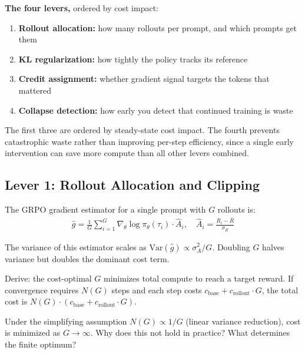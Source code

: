 \medskip
\textbf{The four levers,} ordered by cost impact:
\begin{enumerate}
  \item \textbf{Rollout allocation:} how many rollouts per prompt, and which prompts get them
  \item \textbf{KL regularization:} how tightly the policy tracks its reference
  \item \textbf{Credit assignment:} whether gradient signal targets the tokens that mattered
  \item \textbf{Collapse detection:} how early you detect that continued training is waste
\end{enumerate}

The first three are ordered by steady-state cost impact. The fourth prevents catastrophic waste rather than improving per-step efficiency, since a single early intervention can save more compute than all other levers combined.

\subsection*{Lever 1: Rollout Allocation and Clipping}

\begin{thinkfirst}
The GRPO gradient estimator for a single prompt with $G$ rollouts is:
\begin{align*}
  \hat{g} = \frac{1}{G} \sum_{i=1}^{G} \nabla_\theta \log \pi_\theta(\tau_i) \cdot \hat{A}_i, \quad \hat{A}_i = \frac{R_i - \bar{R}}{\sigma_R}
\end{align*}

The variance of this estimator scales as $\mathrm{Var}(\hat{g}) \propto \sigma^2_A / G$. Doubling $G$ halves variance but doubles the dominant cost term.

Derive: the cost-optimal $G$ minimizes total compute to reach a target reward. If convergence requires $N(G)$ steps and each step costs $c_{\mathrm{base}} + c_{\mathrm{rollout}} \cdot G$, the total cost is $N(G) \cdot (c_{\mathrm{base}} + c_{\mathrm{rollout}} \cdot G)$.

Under the simplifying assumption $N(G) \propto 1/G$ (linear variance reduction), cost is minimized as $G \to \infty$. Why does this not hold in practice? What determines the finite optimum?
\end{thinkfirst}

